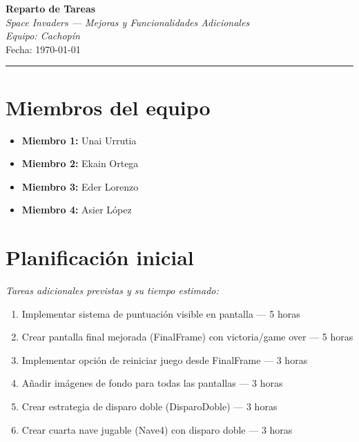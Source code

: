 \documentclass[12pt, a4paper]{article}
\begin{document}
\begin{center}
    {\LARGE \textbf{Reparto de Tareas}}\\[0.4em]
    {\large \textit{Space Invaders — Mejoras y Funcionalidades Adicionales}}\\[0.3em]
    {\small \textit{Equipo: Cachopín}}\\[0.2em]
    {\small Fecha: \today}
\end{center}

\vspace{1em}
\hrule
\vspace{1.5em}

\section{Miembros del equipo}

\begin{itemize}[leftmargin=2em]
    \item \textbf{Miembro 1:} Unai Urrutia
    \item \textbf{Miembro 2:} Ekain Ortega
    \item \textbf{Miembro 3:} Eder Lorenzo
    \item \textbf{Miembro 4:} Asier López
\end{itemize}

\vspace{1.5em}

\section{Planificación inicial}

\textit{Tareas adicionales previstas y su tiempo estimado:}

\begin{enumerate}[leftmargin=2em]
    \item Implementar sistema de puntuación visible en pantalla — 5 horas
    \item Crear pantalla final mejorada (FinalFrame) con victoria/game over — 5 horas
    \item Implementar opción de reiniciar juego desde FinalFrame — 3 horas
    \item Añadir imágenes de fondo para todas las pantallas — 3 horas
    \item Crear estrategia de disparo doble (DisparoDoble) — 3 horas
    \item Crear cuarta nave jugable (Nave4) con disparo doble — 3 horas
\end{enumerate}
\end{document}
